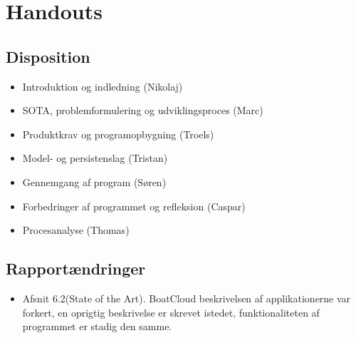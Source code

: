 \documentclass[a4paper,11pt,fleqn,twoside,openright,final]{memoir}
\begin{document}
\sloppy


\chapter{Handouts}

\section{Disposition}

	\begin{itemize}
	\item Introduktion og indledning (Nikolaj)
	\item SOTA, problemformulering og udviklingsproces (Marc)
	\item Produktkrav og programopbygning (Troels)
	\item Model- og persistenslag (Tristan)
	\item Gennemgang af program (Søren)
	\item Forbedringer af programmet og refleksion (Caspar)
	\item Procesanalyse	(Thomas)
	\end{itemize}

\newpage
\section{Rapportændringer}
\begin{itemize}
    \item Afsnit 6.2(State of the Art). BoatCloud beskrivelsen af applikationerne var forkert, en oprigtig beskrivelse er skrevet istedet, funktionaliteten af programmet er stadig den samme.
\end{itemize}


\newpage
\end{document}
